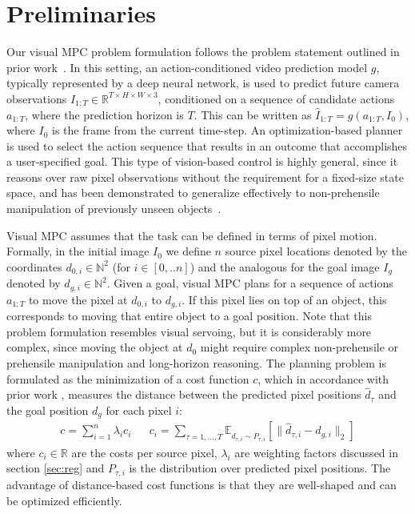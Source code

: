 \vspace{-0.1cm}
\section{Preliminaries}
\label{sec:prelim}
\vspace{-0.2cm}

Our visual MPC problem formulation follows the problem statement outlined in prior work~\cite{foresight}. In this setting, an action-conditioned video prediction model $g$, typically represented by a deep neural network, is used to predict future camera observations $\hat{I}_{1:T} \in \mathbb{R}^{T \times H\times W \times 3}$, conditioned on a sequence of candidate actions $a_{1:T}$, where the prediction horizon is $T$. This can be written as $\hat{I}_{1:T} = g(a_{1:T}, I_0)$, where $I_0$ is the frame from the current time-step. An optimization-based planner is  used to select the action sequence that results in an outcome that accomplishes a user-specified goal. This type of vision-based control is highly general, since it reasons over raw pixel observations without the requirement for a fixed-size state space, and has been demonstrated to generalize effectively to non-prehensile manipulation of previously unseen objects~\cite{foresight,sna}.

Visual MPC assumes that the task can be defined in terms of pixel motion. Formally, in the initial image $I_0$ we define $n$ source pixel locations denoted by the coordinates $d_{0,i} \in \mathbb{N}^2$ (for $i \in [0,..n]$) and the analogous for the goal image $I_g$ denoted by $d_{g,i} \in \mathbb{N}^2$. Given a goal, visual MPC plans for a sequence of actions $a_{1:T}$
to move the pixel at $d_{0,i}$ to $d_{g,i}$. If this pixel lies on top of an object, this corresponds to moving that entire object to a goal position. Note that this problem formulation resembles visual servoing, but it is considerably more complex, since moving the object at $d_0$ might require complex non-prehensile or prehensile manipulation and long-horizon reasoning.
The planning problem is formulated as the minimization of a cost function $c$, which in accordance with prior work \cite{sna}, measures the distance between the predicted pixel positions $\hat{d}_{\tau}$ and the goal position $d_g$ for each pixel $i$:
\begin{align}
c = \sum^n_{i = 1}  \lambda_i c_i && c_i = \sum_{\tau = 1, \dots, T} \mathbb{E}_{\hat{d}_{\tau,i} \sim P_{\tau,i}} \left[\|\hat{d}_{\tau,i} - d_{g,i}\|_2\right]  
\label{eq:cost}
\end{align}
where $c_i\in \mathbb{R}$ are the costs per source pixel, $\lambda_i$ are weighting factors discussed in section \ref{sec:reg} and $P_{\tau,i}$ is the distribution over predicted pixel positions. The advantage of distance-based cost functions is that they are well-shaped and can be optimized efficiently. 

